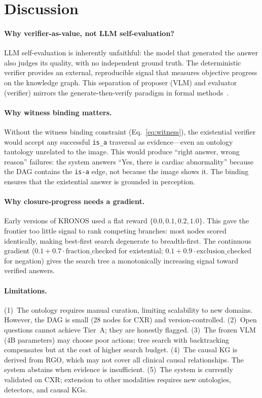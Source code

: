 \documentclass[runningheads]{llncs}
\begin{document}
\section{Discussion}
\label{sec:discussion}

\paragraph{Why verifier-as-value, not LLM self-evaluation?}
LLM self-evaluation is inherently unfaithful: the model that generated
the answer also judges its quality, with no independent ground truth.
The deterministic verifier provides an external, reproducible signal that
measures objective progress on the knowledge graph.
This separation of proposer (VLM) and evaluator (verifier) mirrors the
generate-then-verify paradigm in formal methods~\cite{singh2025verge}.

\paragraph{Why witness binding matters.}
Without the witness binding constraint (Eq.~\ref{eq:witness}), the
existential verifier would accept any successful \texttt{is\_a} traversal
as evidence---even an ontology tautology unrelated to the image.
This would produce ``right answer, wrong reason'' failures: the system
answers ``Yes, there is cardiac abnormality'' because the DAG contains
the \texttt{is-a} edge, not because the image shows it.
The binding ensures that the existential answer is grounded in perception.

\paragraph{Why closure-progress needs a gradient.}
Early versions of KRONOS used a flat reward
$\{0.0, 0.1, 0.2, 1.0\}$.
This gave the frontier too little signal to rank competing branches:
most nodes scored identically, making best-first search degenerate to
breadth-first.
The continuous gradient
($0.1 + 0.7 \cdot \text{fraction\_checked}$ for existential;
$0.1 + 0.9 \cdot \text{exclusion\_checked}$ for negation) gives the
search tree a monotonically increasing signal toward verified answers.

\paragraph{Limitations.}
(1)~The ontology requires manual curation, limiting scalability to new
domains.
However, the DAG is small (28 nodes for CXR) and version-controlled.
(2)~Open questions cannot achieve Tier~A; they are honestly flagged.
(3)~The frozen VLM (4B parameters) may choose poor actions; tree search
with backtracking compensates but at the cost of higher search budget.
(4)~The causal KG is derived from RGO, which may not cover all clinical
causal relationships. The system abstains when evidence is insufficient.
(5)~The system is currently validated on CXR; extension to other modalities
requires new ontologies, detectors, and causal KGs.
\end{document}
